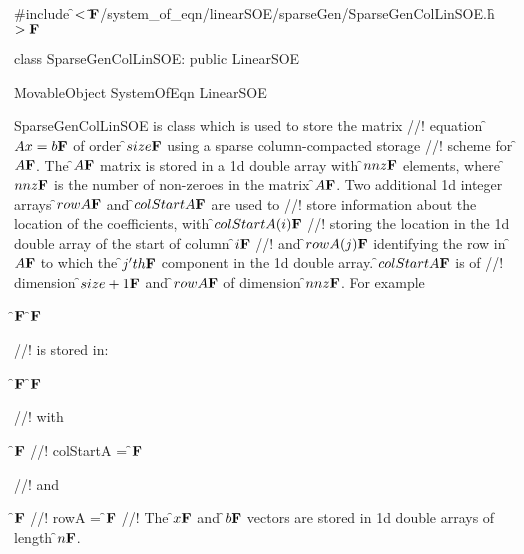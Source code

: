 
\indent \#include \f$<\tilde{ }{\bf F}$/system\_of\_eqn/linearSOE/sparseGen/SparseGenColLinSOE.h\f$>{\bf F}$

\indent class SparseGenColLinSOE: public LinearSOE

\indent MovableObject
\indent\indent SystemOfEqn
\indent\indent\indent LinearSOE
\indent\indent\indent{}

\indent SparseGenColLinSOE is class which is used to store the matrix
//! equation \f$Ax=b{\bf F}$ of order \f$size{\bf F}$ using a sparse column-compacted storage
//! scheme for \f$A{\bf F}$. The \f$A{\bf F}$ matrix is stored in a 1d double array with
\f$nnz{\bf F}$ elements, where \f$nnz{\bf F}$ is the number of non-zeroes in the matrix
\f$A{\bf F}$. Two additional 1d integer arrays \f$rowA{\bf F}$ and \f$colStartA{\bf F}$ are used to
//! store information about the location of the coefficients, with \f$colStartA(i){\bf F}$
//! storing the location in the 1d double array of the start of column \f$i{\bf F}$
//! and \f$rowA(j){\bf F}$ identifying the row in \f$A{\bf F}$ to which the
\f$j'th{\bf F}$ component in the 1d double array. \f$colStartA{\bf F}$ is of
//! dimension \f$size+1{\bf F}$ and \f$rowA{\bf F}$ of dimension \f$nnz{\bf F}$. For example

\f${\bf F}$
\f${\bf F}$

//! is stored in:

\f${\bf F}$
\f${\bf F}$

//! with

\f${\bf F}$
//! colStartA =
\f${\bf F}$

//! and

\f${\bf F}$
//! rowA =
\f${\bf F}$
//! The \f$x{\bf F}$ and \f$b{\bf F}$ vectors are stored in 1d double arrays of length \f$n{\bf F}$.

